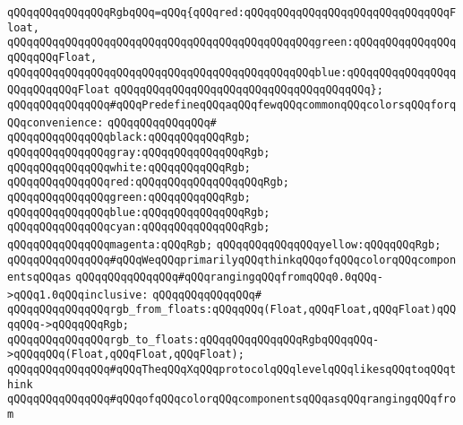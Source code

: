 \verb|qQQqqQQqqQQqqQQqRgbqQQq=qQQq{qQQqred:qQQqqQQqqQQqqQQqqQQqqQQqqQQqqQQqFloat,|\newline
\verb|qQQqqQQqqQQqqQQqqQQqqQQqqQQqqQQqqQQqqQQqqQQqqQQqgreen:qQQqqQQqqQQqqQQqqQQqqQQqFloat,|\newline
\verb|qQQqqQQqqQQqqQQqqQQqqQQqqQQqqQQqqQQqqQQqqQQqqQQqblue:qQQqqQQqqQQqqQQqqQQqqQQqqQQqFloat|\newline
\verb|qQQqqQQqqQQqqQQqqQQqqQQqqQQqqQQqqQQqqQQq};|\newline
\newline
\verb|qQQqqQQqqQQqqQQq#qQQqPredefineqQQqaqQQqfewqQQqcommonqQQqcolorsqQQqforqQQqconvenience:|\newline
\verb|qQQqqQQqqQQqqQQq#|\newline
\verb|qQQqqQQqqQQqqQQqblack:qQQqqQQqqQQqRgb;|\newline
\verb|qQQqqQQqqQQqqQQqgray:qQQqqQQqqQQqqQQqRgb;|\newline
\verb|qQQqqQQqqQQqqQQqwhite:qQQqqQQqqQQqRgb;|\newline
\verb|qQQqqQQqqQQqqQQqred:qQQqqQQqqQQqqQQqqQQqRgb;|\newline
\verb|qQQqqQQqqQQqqQQqgreen:qQQqqQQqqQQqRgb;|\newline
\verb|qQQqqQQqqQQqqQQqblue:qQQqqQQqqQQqqQQqRgb;|\newline
\verb|qQQqqQQqqQQqqQQqcyan:qQQqqQQqqQQqqQQqRgb;|\newline
\verb|qQQqqQQqqQQqqQQqmagenta:qQQqRgb;|\newline
\verb|qQQqqQQqqQQqqQQqyellow:qQQqqQQqRgb;|\newline
\newline
\verb|qQQqqQQqqQQqqQQq#qQQqWeqQQqprimarilyqQQqthinkqQQqofqQQqcolorqQQqcomponentsqQQqas|\newline
\verb|qQQqqQQqqQQqqQQq#qQQqrangingqQQqfromqQQq0.0qQQq->qQQq1.0qQQqinclusive:|\newline
\verb|qQQqqQQqqQQqqQQq#|\newline
\verb|qQQqqQQqqQQqqQQqrgb_from_floats:qQQqqQQq(Float,qQQqFloat,qQQqFloat)qQQqqQQq->qQQqqQQqRgb;|\newline
\verb|qQQqqQQqqQQqqQQqrgb_to_floats:qQQqqQQqqQQqqQQqRgbqQQqqQQq->qQQqqQQq(Float,qQQqFloat,qQQqFloat);|\newline
\newline
\verb|qQQqqQQqqQQqqQQq#qQQqTheqQQqXqQQqprotocolqQQqlevelqQQqlikesqQQqtoqQQqthink|\newline
\verb|qQQqqQQqqQQqqQQq#qQQqofqQQqcolorqQQqcomponentsqQQqasqQQqrangingqQQqfrom|\newline
